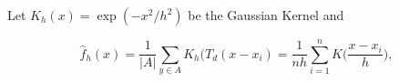 Let  $K_h(x) = \exp( -x^2/h^2)$ be the Gaussian Kernel and

\[
    \hat{f}_h(x) = \frac{1}{|A|}\sum_{ y \in A} K_h (T_d(x - x_i) = \frac{1}{nh} \sum_{i=1}^n K\Big(\frac{x-x_i}{h}\Big),
  \]